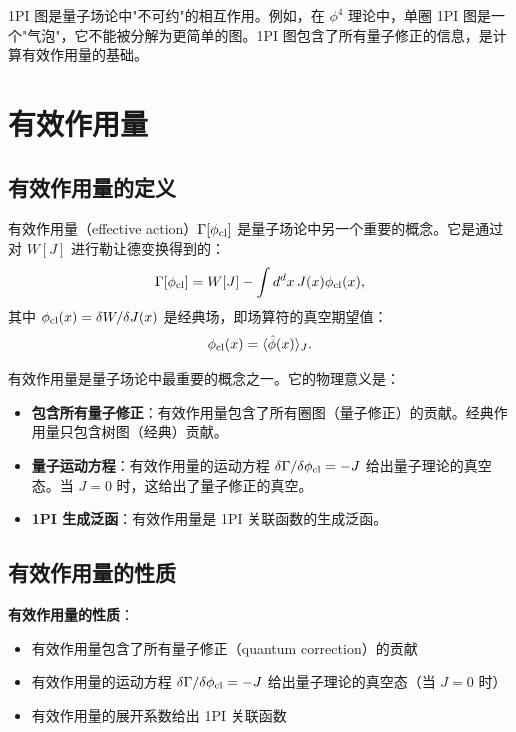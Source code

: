 \begin{note}[1PI 的物理意义]
1PI 图是量子场论中"不可约"的相互作用。例如，在 $\phi^4$ 理论中，单圈 1PI 图是一个"气泡"，它不能被分解为更简单的图。1PI 图包含了所有量子修正的信息，是计算有效作用量的基础。
\end{note}

\section{有效作用量}

\subsection{有效作用量的定义}

\begin{definition}[有效作用量]
有效作用量（effective action）$\Gamma[\phi_{\rm cl}]$ 是量子场论中另一个重要的概念。它是通过对 $W[J]$ 进行勒让德变换得到的：
\begin{equation}
    \Gamma[\phi_{\rm cl}] = W[J] - \int d^d x \, J(x) \phi_{\rm cl}(x),
    \label{eq:eff_action}
\end{equation}
其中 $\phi_{\rm cl}(x) = \delta W / \delta J(x)$ 是经典场，即场算符的真空期望值：
\begin{equation}
    \phi_{\rm cl}(x) = \langle \hat{\phi}(x) \rangle_J.
\end{equation}
\end{definition}

\begin{note}[有效作用量的物理意义]
有效作用量是量子场论中最重要的概念之一。它的物理意义是：
\begin{itemize}
    \item \textbf{包含所有量子修正}：有效作用量包含了所有圈图（量子修正）的贡献。经典作用量只包含树图（经典）贡献。
    \item \textbf{量子运动方程}：有效作用量的运动方程 $\delta \Gamma / \delta \phi_{\rm cl} = -J$ 给出量子理论的真空态。当 $J = 0$ 时，这给出了量子修正的真空。
    \item \textbf{1PI 生成泛函}：有效作用量是 1PI 关联函数的生成泛函。
\end{itemize}
\end{note}

\subsection{有效作用量的性质}

\begin{property}[有效作用量的性质]
\textbf{有效作用量的性质}：
\begin{itemize}
    \item 有效作用量包含了所有量子修正（quantum correction）的贡献
    \item 有效作用量的运动方程 $\delta \Gamma / \delta \phi_{\rm cl} = -J$ 给出量子理论的真空态（当 $J = 0$ 时）
    \item 有效作用量的展开系数给出 1PI 关联函数
\end{itemize}
\end{property}

